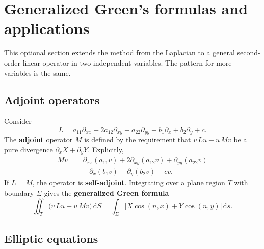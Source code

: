 \section{Generalized Green's formulas and applications}
\label{sec:generalized-green}

This optional section extends the method from the Laplacian to a general second-order linear operator in two independent variables. The pattern for more variables is the same.

\subsection{Adjoint operators}

Consider
\begin{equation}
L=a_{11}\partial_{xx}+2a_{12}\partial_{xy}+a_{22}\partial_{yy}
+b_1\partial_x+b_2\partial_y+c.
\end{equation}
The \textbf{adjoint} operator $M$ is defined by the requirement that $v\,Lu-u\,Mv$ be a pure divergence $\partial_x X+\partial_y Y$. Explicitly,
\begin{equation}
\begin{aligned}
Mv
&=\partial_{xx}(a_{11}v)+2\partial_{xy}(a_{12}v)+\partial_{yy}(a_{22}v)\\
&\quad-\partial_x(b_1 v)-\partial_y(b_2 v)+cv.
\end{aligned}
\end{equation}
If $L=M$, the operator is \textbf{self-adjoint}. Integrating over a plane region $T$ with boundary $\Sigma$ gives the \textbf{generalized Green formula}
\begin{equation}
\label{eq:gen-green}
\iint_{T}\bigl(v\,Lu-u\,Mv\bigr)\,\mathrm{d}S
=\int_{\Sigma}\bigl[X\cos(n,x)+Y\cos(n,y)\bigr]\,\mathrm{d}s.
\end{equation}

\subsection{Elliptic equations}

